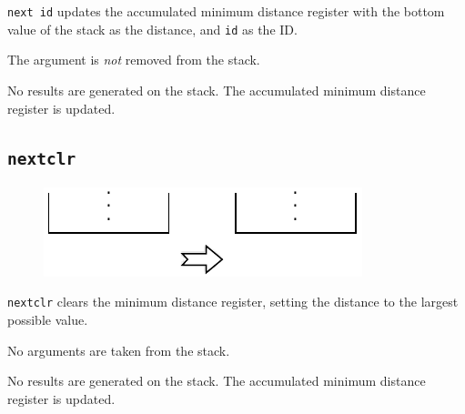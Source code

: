 			\texttt{next id} updates the accumulated minimum distance register
			with the bottom value of the stack as the distance, and \texttt{id}
			as the ID.

			The argument is \emph{not} removed from the stack.
			
			No results are generated on the stack. The accumulated minimum 
			distance register is updated.
	
	\qquad

	\subsection*{\texttt{nextclr}}
	
		\begin{figure}
			\begin{flushright}
				\includegraphics[width=\linewidth]{figure/pdf/i_nop} 
			\end{flushright}
		\end{figure}
	
			\texttt{nextclr} clears the minimum distance register, setting the
			distance to the largest possible value.

			No arguments are taken from the stack.
			
			No results are generated on the stack. The accumulated minimum 
			distance register is updated.
	
	\qquad
